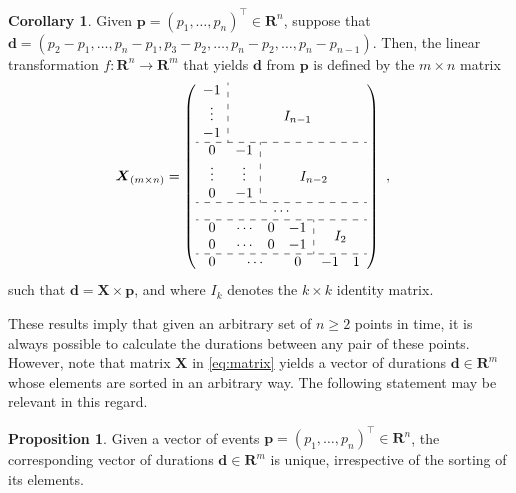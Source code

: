 \documentclass[12pt,oneside,a4paper,doublespacing]{article} %
\theoremstyle{definition}
\newtheorem{proposition}{Proposition}[section]
\newtheorem{corollary}{Corollary}[proposition]
\begin{document}
\begin{corollary}
 Given $\boldsymbol{p}=(p_1,\ldots,p_n)^\top\in\mathbf{R}^n$, suppose that $\boldsymbol{d}=(p_2-p_1,\dots,p_n-p_1,p_3-p_2,\dots,p_n-p_2,\dots,p_n-p_{n-1})$. Then, the linear transformation $f:\mathbf{R}^n\to\mathbf{R}^m$ that yields $\boldsymbol{d}$ from $\boldsymbol{p}$ is defined by the $m\times n$ matrix
 \begin{align}
  \boldsymbol{X}_{(m\times n)}&= \left(\begin{array}{cccccc}
			  \multicolumn{1}{c:}{-1}			& \multicolumn{5}{c}{}					\\
			  \multicolumn{1}{c:}{\vdots}	 		& \multicolumn{5}{c}{I_{n-1}}	 			\\  
			  \multicolumn{1}{c:}{-1}			& \multicolumn{5}{c}{}					\\ \hdashline
			  0		& \multicolumn{1}{c:}{-1}	& \multicolumn{4}{c}{}					\\	 
			  \vdots	& \multicolumn{1}{c:}{\vdots}	& \multicolumn{4}{c}{I_{n-2}}  				\\
			  0		& \multicolumn{1}{c:}{-1}	& \multicolumn{4}{c}{}					\\ \hdashline
			  \multicolumn{6}{c}{\cdots}										\\ \hdashline
			  0		& \cdots	& 0		& \multicolumn{1}{c:}{-1}	& 	& 		\\ 
			  0		& \cdots	& 0		& \multicolumn{1}{c:}{-1}	& \multicolumn{2}{c}{\smash{\raisebox{.5\normalbaselineskip}{$I_2$}}}	\\ \hdashline
			  0		& \multicolumn{2}{c}{\cdots}	& 0				& -1	& 1		\\
			\end{array}\right)
  \label{eq:matrix}\ ,
 \end{align}
 such that $\boldsymbol{d}=\boldsymbol{X}\times\boldsymbol{p}$, and where $I_k$ denotes the $k\times k$ identity matrix.
\end{corollary}

These results imply that given an arbitrary set of $n\geq2$ points in time, it
is always possible to calculate the durations between any pair of these points. However, note that matrix $\boldsymbol{X}$ in \eqref{eq:matrix} yields a vector of durations $\boldsymbol{d}\in\mathbf{R}^m$ whose elements are sorted in an arbitrary way. The following statement may be relevant in this regard.

\begin{proposition}
 Given a vector of events $\boldsymbol{p}=(p_1,\ldots,p_n)^\top\in\mathbf{R}^n$, the corresponding vector of durations $\boldsymbol{d}\in\mathbf{R}^m$ is unique, irrespective of the sorting of its elements.
\end{proposition}
\end{document}
